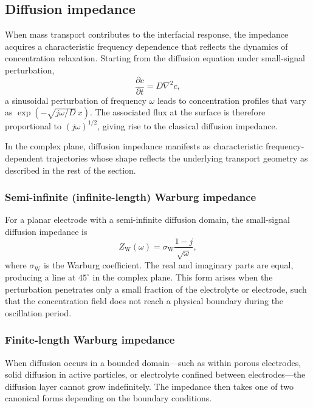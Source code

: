 \subsection{Diffusion impedance}

When mass transport contributes to the interfacial response, the impedance acquires a characteristic frequency dependence that reflects the dynamics of concentration relaxation.
Starting from the diffusion equation under small-signal perturbation,
\[
\frac{\partial c}{\partial t} = D \nabla^2 c,
\]
a sinusoidal perturbation of frequency $\omega$ leads to concentration profiles that vary as $\exp(-\sqrt{j\omega/D}\, x)$. The associated flux at the surface is therefore proportional to $(j\omega)^{1/2}$, giving rise to the classical diffusion impedance.

In the complex plane, diffusion impedance manifests as characteristic frequency-dependent trajectories whose shape reflects the underlying transport geometry as described in the rest of the section.

\subsubsection{Semi-infinite (infinite-length) Warburg impedance}

For a planar electrode with a semi-infinite diffusion domain, the small-signal diffusion impedance is
\begin{equation}
    Z_{\mathrm{W}}(\omega) = \sigma_{\mathrm{W}} \frac{1 - j}{\sqrt{\omega}},
\end{equation}
where $\sigma_{\mathrm{W}}$ is the Warburg coefficient. The real and imaginary parts are equal, producing a line at $45^\circ$ in the complex plane. This form arises when the perturbation penetrates only a small fraction of the electrolyte or electrode, such that the concentration field does not reach a physical boundary during the oscillation period.

\subsubsection{Finite-length Warburg impedance}

When diffusion occurs in a bounded domain—such as within porous electrodes, solid diffusion in active particles, or electrolyte confined between electrodes—the diffusion layer cannot grow indefinitely. The impedance then takes one of two canonical forms depending on the boundary conditions.

